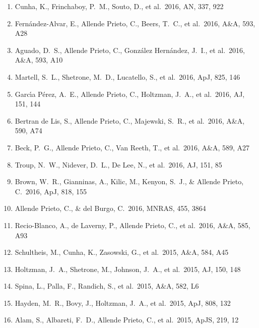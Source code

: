 \documentclass[12pt]{article}
\begin{document}
\begin{enumerate}
\item Cunha, K., Frinchaboy, P.~M., Souto, D., et al.\ 2016, AN, 337, 922 


\item Fern{\'a}ndez-Alvar, E., Allende Prieto, C., Beers, T.~C., et al.\ 2016, A\&A, 593, A28 


\item Aguado, D.~S., Allende Prieto, C., Gonz{\'a}lez Hern{\'a}ndez, J.~I., et al.\ 2016, A\&A, 593, A10 


\item Martell, S.~L., Shetrone, M.~D., Lucatello, S., et al.\ 2016, ApJ, 825, 146 


\item Garc{\'{\i}}a P{\'e}rez, A.~E., Allende Prieto, C., Holtzman, J.~A., et al.\ 2016, AJ, 151, 144 


\item Bertran de Lis, S., Allende Prieto, C., Majewski, S.~R., et al.\ 2016, A\&A, 590, A74 


\item Beck, P.~G., Allende Prieto, C., Van Reeth, T., et al.\ 2016, A\&A, 589, A27 


\item Troup, N.~W., Nidever, D.~L., De Lee, N., et al.\ 2016, AJ, 151, 85 


\item Brown, W.~R., Gianninas, A., Kilic, M., Kenyon, S.~J., \& Allende Prieto, C.\ 2016, ApJ, 818, 155 


\item Allende Prieto, C., \& del Burgo, C.\ 2016, MNRAS, 455, 3864 


\item Recio-Blanco, A., de Laverny, P., Allende Prieto, C., et al.\ 2016, A\&A, 585, A93 


\item Schultheis, M., Cunha, K., Zasowski, G., et al.\ 2015, A\&A, 584, A45 


\item Holtzman, J.~A., 
Shetrone, M., Johnson, J.~A., et al.\ 2015, AJ, 150, 148 


\item Spina, L., Palla, F., Randich, S., et al.\ 2015, A\&A, 582, L6 


\item Hayden, M.~R., Bovy, J., 
Holtzman, J.~A., et al.\ 2015, ApJ, 808, 132 


\item Alam, S., Albareti, F.~D., 
Allende Prieto, C., et al.\ 2015, ApJS, 219, 12 



\end{enumerate}
\end{document}

